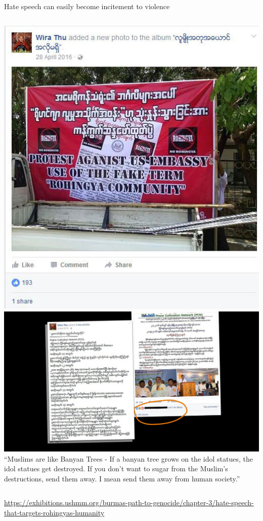 \documentclass[nobackground,dvipsnames,table]{beamer}
\begin{document}
\begin{frame}{Hate speech can easily become incitement to violence}
    \begin{columns}[T]
            \includegraphics[width=\textwidth]{myanmar-incitement-1}
            \includegraphics[width=\textwidth]{myanmar-incitement-2}
            \footnotesize
            “Muslims are like Banyan Trees - If a banyan tree grows on the idol statues, the idol statues get destroyed. If you don’t want to sugar from the Muslim’s destructions, send them away. I mean send them away from human society.”
    \end{columns}
    \tiny
    \url{https://exhibitions.ushmm.org/burmas-path-to-genocide/chapter-3/hate-speech-that-targets-rohingyas-humanity}
\end{frame}
\end{document}
